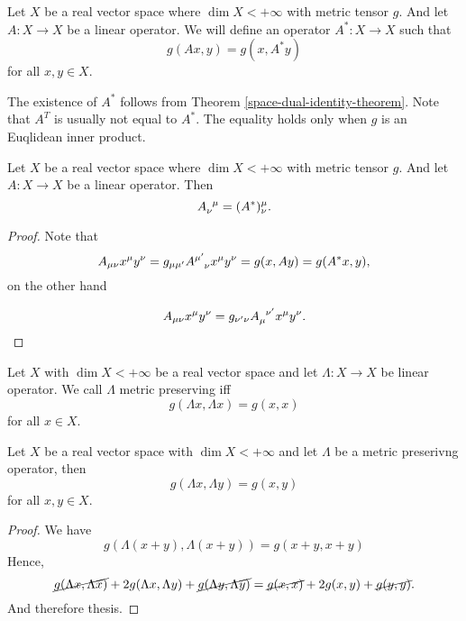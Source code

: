 \documentclass[main.tex]{subfiles}
\begin{document}
\begin{definition}
Let $X$ be a real vector space where $\dim X < +\infty$ with metric tensor $g$. And let $A:X\to X$ be a linear operator. We will define an operator $A^*: X \to X$ such that
\begin{equation}
g(Ax, y) = g(x, A^*y)
\end{equation}
for all $x, y\in X$.
\end{definition}

The existence of $A^*$ follows from Theorem \ref{space-dual-identity-theorem}.
Note that $A^T$ is usually not equal to $A^*$. The equality holds only when $g$ is an Euqlidean inner product.

\begin{theorem}
Let $X$ be a real vector space where $\dim X < +\infty$ with metric tensor $g$. And let $A:X\to X$ be a linear operator. Then
\begin{equation}
\tensor{A}{_\nu^\mu} = (A^*)^\mu_\nu.
\end{equation}
\end{theorem}
\begin{proof}
Note that 
\begin{equation}
A_{\mu\nu} x^\mu y^\nu = g_{\mu\mu'} \tensor{A}{^{\mu'}_{\nu}} x^\mu y^\nu = g(x, Ay) = g(A^*x, y),
\end{equation}
on the other hand

\begin{equation}
A_{\mu\nu} x^\mu y^\nu = g_{\nu'\nu} \tensor{A}{_\mu^{\nu'}} x^\mu y^\nu.
\end{equation}

\end{proof}

\begin{definition}
Let $X$ with $\dim X < +\infty$ be a real vector space and let $\Lambda: X \to X$ be linear operator. We call $\Lambda$ metric preserving iff
\begin{equation}
g(\Lambda x, \Lambda x) = g(x, x)
\end{equation}
for all $x \in X$.
\end{definition}

\begin{lemma}
\label{metric-preserving-sep}
Let $X$ be a real vector space with $\dim X < +\infty$ and let $\Lambda$ be a metric preserivng operator, then
\begin{equation}
g(\Lambda x, \Lambda y) = g(x, y)
\end{equation} 
for all $x, y\in X$.
\end{lemma}
\begin{proof}
We have
\begin{equation}
g(\Lambda (x + y), \Lambda (x + y)) = g(x + y, x + y)
\end{equation}
Hence,
\begin{equation}
\cancel{g(\Lambda x, \Lambda x)} + 2g(\Lambda x, \Lambda y) + \cancel{g(\Lambda y, \Lambda y)} =
\cancel{g(x, x)} + 2g(x, y) + \cancel{g(y, y)}.
\end{equation}
And therefore thesis.
\end{proof}
\end{document}
